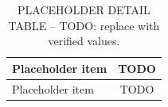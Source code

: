 \begin{table}[t]
  \centering
  \caption{PLACEHOLDER DETAIL TABLE -- TODO: replace with verified values.}
  \label{tab:placeholder-detail}
  \begin{tabular}{lc}
    \hline
    Placeholder item & TODO \\
    \hline
    Placeholder item & TODO \\
    \hline
  \end{tabular}
\end{table}
